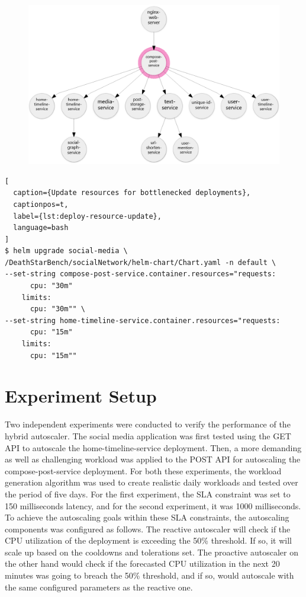 \begin{figure}[htb]
\begin{minipage}{0.75\linewidth}
        \includegraphics[width=1.0\linewidth]{Figures/Compose-Post-POST-Trace.png}
    \end{minipage}
\end{figure}

\begin{lstlisting}[
  caption={Update resources for bottlenecked deployments},
  captionpos=t,
  label={lst:deploy-resource-update},
  language=bash
]
$ helm upgrade social-media \
/DeathStarBench/socialNetwork/helm-chart/Chart.yaml -n default \
--set-string compose-post-service.container.resources="requests: 
      cpu: "30m"
    limits:
      cpu: "30m"" \
--set-string home-timeline-service.container.resources="requests: 
      cpu: "15m"
    limits:
      cpu: "15m""
\end{lstlisting}

\section{Experiment Setup}
\label{sec:ch5-exp-setup}

Two independent experiments were conducted to verify the performance of the hybrid autoscaler. The social media application was first tested using the GET API to autoscale the home-timeline-service deployment. Then, a more demanding as well as challenging workload was applied to the POST API for autoscaling the compose-post-service deployment. For both these experiments, the workload generation algorithm was used to create realistic daily workloads and tested over the period of five days. For the first experiment, the SLA constraint was set to 150 milliseconds latency, and for the second experiment, it was 1000 milliseconds. To achieve the autoscaling goals within these SLA constraints, the autoscaling components was configured as follows. The reactive autoscaler will check if the CPU utilization of the deployment is exceeding the 50\% threshold. If so, it will scale up based on the cooldowns and tolerations set. The proactive autoscaler on the other hand would check if the forecasted CPU utilization in the next 20 minutes was going to breach the 50\% threshold, and if so, would autoscale with the same configured parameters as the reactive one.

